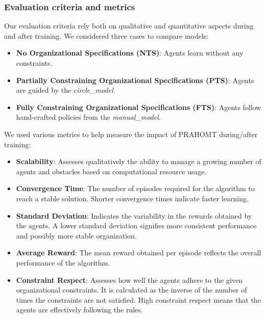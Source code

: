 \documentclass[sigconf,anonymous]{aamas}
\begin{document}
\subsubsection{Evaluation criteria and metrics}

Our evaluation criteria rely both on qualitative and quantitative aspects during and after training. We considered three cases to compare models:
\begin{itemize}
  \item \textbf{No Organizational Specifications (NTS)}: Agents learn without any constraints.
  \item \textbf{Partially Constraining Organizational Specifications (PTS)}: Agents are guided by the \textit{circle\_model}.
  \item \textbf{Fully Constraining Organizational Specifications (FTS)}: Agents follow hand-crafted policies from the \textit{manual\_model}.
\end{itemize}

We used various metrics to help measure the impact of PRAHOMT during/after training:
\begin{itemize}
  \item \textbf{Scalability}: Assesses qualitatively the ability to manage a growing number of agents and obstacles based on computational resource usage.
  \item \textbf{Convergence Time}: The number of episodes required for the algorithm to reach a stable solution. Shorter convergence times indicate faster learning.
  \item \textbf{Standard Deviation}: Indicates the variability in the rewards obtained by the agents. A lower standard deviation signifies more consistent performance and possibly more stable organization.
  \item \textbf{Average Reward}: The mean reward obtained per episode reflects the overall performance of the algorithm.
  \item \textbf{Constraint Respect}: Assesses how well the agents adhere to the given organizational constraints. It is calculated as the inverse of the number of times the constraints are not satisfied. High constraint respect means that the agents are effectively following the rules.
\end{itemize}
\end{document}
